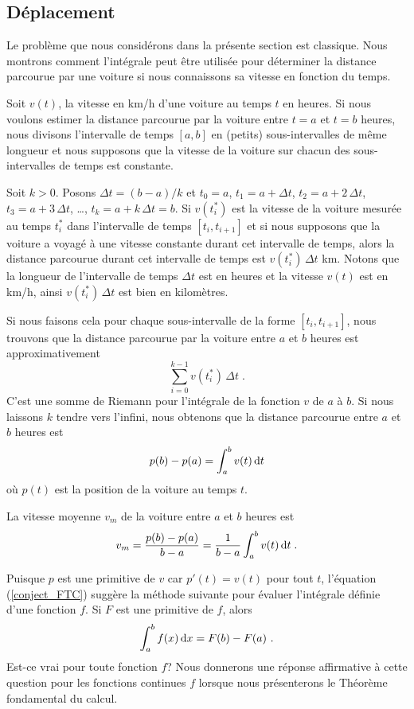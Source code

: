 {\subsection{Déplacement}\label{deplace}

Le problème que nous considérons dans la présente section est
classique.  Nous montrons comment l'intégrale peut être utilisée pour
déterminer la distance parcourue par une voiture si nous connaissons sa
vitesse en fonction du temps.

Soit $v(t)$, la vitesse en km/h d'une voiture au temps $t$ en heures.
Si nous voulons estimer la distance parcourue par la voiture entre $t=a$ et
$t=b$ heures, nous divisons l'intervalle de temps $[a,b]$ en (petits)
sous-intervalles de même longueur et nous supposons que la vitesse de la
voiture sur chacun des sous-intervalles de temps est constante.

Soit $k>0$.  Posons $\Delta t = (b-a)/k$ et $t_0 = a$,
$t_1 = a + \Delta t$, $t_2 = a + 2\,\Delta t$, $t_3 = a + 3\,\Delta t$,
\ldots, $t_k = a + k\,\Delta t = b$.  Si $v(t_i^\ast)$ est la vitesse
de la voiture mesurée au temps $t_i^\ast$ dans l'intervalle de temps
$[t_i, t_{i+1}]$ et si nous supposons que la voiture a voyagé à une
vitesse constante durant cet intervalle de temps, alors la distance
parcourue durant cet intervalle de temps est $v(t_i^\ast)\, \Delta t$
km.  Notons que la longueur de l'intervalle de temps $\Delta t$ est
en heures et la vitesse $v(t)$ est en km/h, ainsi
$v(t_i^\ast)\, \Delta t$ est bien en kilomètres. 

Si nous faisons cela pour chaque sous-intervalle de la forme
$[t_i,t_{i+1}]$, nous trouvons que la distance parcourue par la voiture
entre $a$ et $b$ heures est approximativement
\[
\sum_{i=0}^{k-1} v(t_i^\ast)\,\Delta t \; .
\]
C'est une somme de Riemann pour l'intégrale de la fonction $v$ de $a$
à $b$.  Si nous laissons $k$ tendre vers l'infini, nous obtenons que la
distance parcourue entre $a$ et $b$ heures est
\begin{equation} \label{conject_FTC}
p(b)-p(a) = \int_a^b v(t)\,\mathrm{d}t
\end{equation}
où $p(t)$ est la position de la voiture au temps $t$.

La vitesse moyenne $v_m$ de la voiture entre $a$ et $b$ heures est
\[
v_m = \frac{p(b)-p(a)}{b-a} = \frac{1}{b-a}\int_a^b v(t) \,\mathrm{d}t \; .
\]

\begin{rmk}
Puisque $p$ est une primitive de $v$ car $p'(t)=v(t)$ pour tout $t$,
l'équation (\ref{conject_FTC}) suggère la méthode suivante pour
évaluer l'intégrale définie d'une fonction $f$.   Si $F$ est une
primitive de $f$, alors
\[
\int_a^b f(x) \dx{x} = F(b) - F(a) \ .
\]
Est-ce vrai pour toute fonction $f$?  Nous donnerons une réponse
affirmative à cette question pour les fonctions continues $f$ lorsque
nous présenterons le Théorème fondamental du calcul.
\label{preTFC}
\end{rmk}

}
